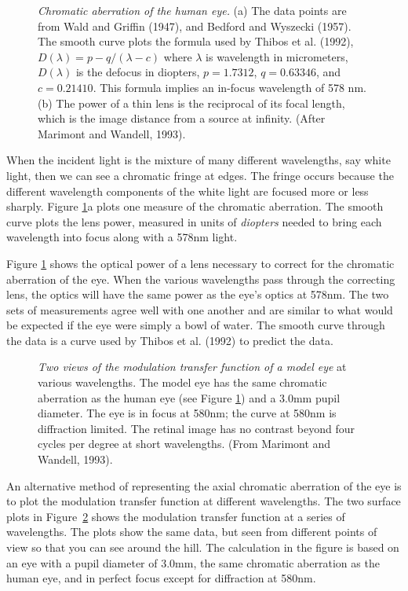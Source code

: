 \begin{figure}
\centerline{
}
\caption[Chromatic Aberration]{ 
{\em Chromatic aberration of the human eye.}
(a) The data points
are from Wald and Griffin (1947), and Bedford and Wyszecki (1957).
The smooth curve plots the formula used by Thibos et al. (1992),
$D(\lambda) = p -  q / (\lambda - c )$
where $\lambda$ is wavelength in micrometers,
$D(\lambda)$ is the defocus in diopters,
$p =1.7312$, $q = 0.63346$, and $c = 0.21410$.
This formula implies an in-focus wavelength of 578 nm. 
(b) The power of a thin lens is the reciprocal
of its focal length, which is the image distance
from a source at infinity.
(After Marimont and Wandell, 1993).
}
\label{f1:c.aberration}
\end{figure}
When the incident light is the mixture of many different
wavelengths, say white light, then
we can see a chromatic fringe at edges.
The fringe occurs because
the different wavelength components of the white light
are focused more or less sharply.
Figure \ref{f1:c.aberration}a
plots one measure of the chromatic aberration.
The smooth curve plots the lens power, measured
in units of {\em diopters} needed to bring
each wavelength into focus along with a 578nm light.

Figure \ref{f1:c.aberration} shows the optical power of a lens
necessary to correct for the chromatic aberration of the eye.
When the various wavelengths pass through
the correcting lens, the optics will have the
same power as the eye's optics at 578nm.
The two sets of measurements
agree well with one another and are similar to what
would be expected if the eye were simply a bowl of water.
The smooth curve through the data is a curve
used by Thibos et al. (1992) to predict the data.

\begin{figure}
\centerline{
}
\caption[OTF of Chromatic Aberration]{
{\em Two views of the modulation transfer function of a model eye}
at various wavelengths.
The model eye has the same chromatic aberration as
the human eye (see Figure \ref{f1:c.aberration})
and a 3.0mm pupil diameter.
The eye is in focus at 580nm;
the curve at 580nm is diffraction limited.
The retinal image has no contrast beyond
four cycles per degree at short wavelengths.
(From Marimont and Wandell, 1993).
}
\label{f1:otf.aberration}
\end{figure}
An alternative method of representing the axial
chromatic aberration
of the eye is to plot the modulation transfer function at
different wavelengths.
The two surface plots in Figure~\ref{f1:otf.aberration}
shows the modulation
transfer function at a series of wavelengths.
The plots show the same data, but seen from different points of view
so that you can see around the hill.
The calculation in the figure is based on an eye
with a pupil diameter of 3.0mm,
the same chromatic aberration as the human eye, 
and in perfect focus except for diffraction at 580nm.
\nocite{MarimontWandell}	%
\nocite{ThibosAppliedOptics1992,WaldGriffin,BedfordWyszecki}

